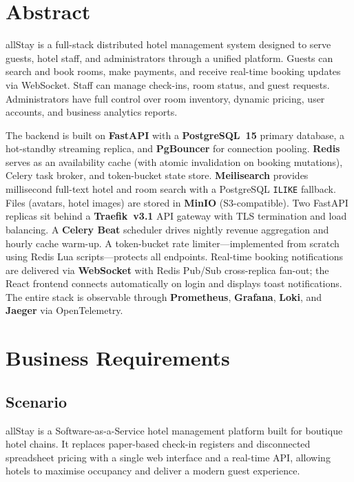 \documentclass[12pt,a4paper]{article}
\begin{document}
\newpage
\setcounter{page}{1}

\section*{Abstract}

allStay is a full-stack distributed hotel management system designed to serve guests, hotel staff, and administrators through a unified platform. Guests can search and book rooms, make payments, and receive real-time booking updates via WebSocket. Staff can manage check-ins, room status, and guest requests. Administrators have full control over room inventory, dynamic pricing, user accounts, and business analytics reports.

The backend is built on \textbf{FastAPI} with a \textbf{PostgreSQL~15} primary database, a hot-standby streaming replica, and \textbf{PgBouncer} for connection pooling. \textbf{Redis} serves as an availability cache (with atomic invalidation on booking mutations), Celery task broker, and token-bucket state store. \textbf{Meilisearch} provides millisecond full-text hotel and room search with a PostgreSQL \texttt{ILIKE} fallback. Files (avatars, hotel images) are stored in \textbf{MinIO} (S3-compatible). Two FastAPI replicas sit behind a \textbf{Traefik~v3.1} API gateway with TLS termination and load balancing. A \textbf{Celery Beat} scheduler drives nightly revenue aggregation and hourly cache warm-up. A token-bucket rate limiter---implemented from scratch using Redis Lua scripts---protects all endpoints. Real-time booking notifications are delivered via \textbf{WebSocket} with Redis Pub/Sub cross-replica fan-out; the React frontend connects automatically on login and displays toast notifications. The entire stack is observable through \textbf{Prometheus}, \textbf{Grafana}, \textbf{Loki}, and \textbf{Jaeger} via OpenTelemetry.

\section{Business Requirements}

\subsection{Scenario}
allStay is a Software-as-a-Service hotel management platform built for boutique hotel chains. It replaces paper-based check-in registers and disconnected spreadsheet pricing with a single web interface and a real-time API, allowing hotels to maximise occupancy and deliver a modern guest experience.
\end{document}
